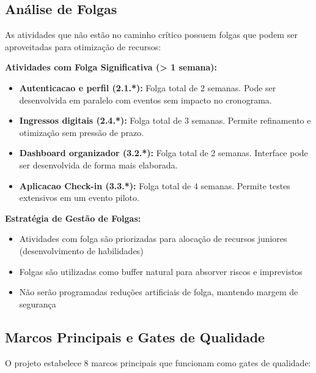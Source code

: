 \subsection{Análise de Folgas}

As atividades que não estão no caminho crítico possuem folgas que podem ser aproveitadas para otimização de recursos:

\textbf{Atividades com Folga Significativa (> 1 semana):}
\begin{itemize}
    \item \textbf{Autenticacao e perfil (2.1.*):} Folga total de 2 semanas. Pode ser desenvolvida em paralelo com eventos sem impacto no cronograma.
    \item \textbf{Ingressos digitais (2.4.*):} Folga total de 3 semanas. Permite refinamento e otimização sem pressão de prazo.
    \item \textbf{Dashboard organizador (3.2.*):} Folga total de 2 semanas. Interface pode ser desenvolvida de forma mais elaborada.
    \item \textbf{Aplicacao Check-in (3.3.*):} Folga total de 4 semanas. Permite testes extensivos em um evento piloto.
\end{itemize}

\textbf{Estratégia de Gestão de Folgas:}
\begin{itemize}
    \item Atividades com folga são priorizadas para alocação de recursos juniores (desenvolvimento de habilidades)
    \item Folgas são utilizadas como buffer natural para absorver riscos e imprevistos
    \item Não serão programadas reduções artificiais de folga, mantendo margem de segurança
\end{itemize}

\subsection{Marcos Principais e Gates de Qualidade}

O projeto estabelece 8 marcos principais que funcionam como gates de qualidade:

